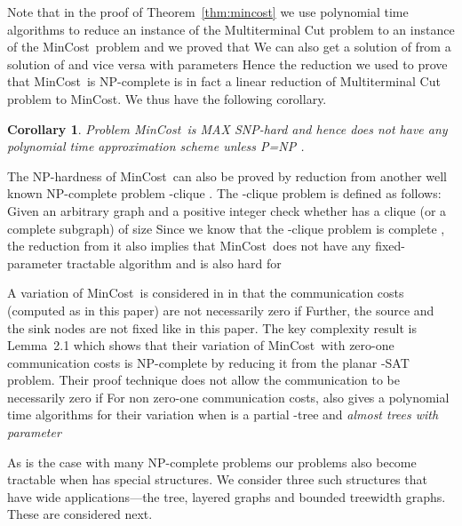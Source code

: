\documentclass[journal]{IEEEtran}
\newtheorem{corollary}{{\bf Corollary}}
\newcommand{\mincost}{\textsf{MinCost}}
\begin{document}
Note that in the proof of Theorem~\ref{thm:mincost} we use polynomial
time algorithms to reduce an instance  of the Multiterminal Cut
problem to an instance  of the \mincost\ problem and we proved
that  We can also get a
solution of  from a solution of  and vice versa with
parameters  Hence the reduction we used to prove
that \mincost\ is NP-complete is in fact a linear reduction of
Multiterminal Cut problem to \mincost. We thus have the following
corollary.

\begin{corollary}
  Problem \mincost\ is MAX SNP-hard and hence does not have any
  polynomial time approximation scheme unless P=NP \cite{Arora92}.
\end{corollary}



The NP-hardness of \mincost\ can also be proved by reduction from
another well known NP-complete problem -clique \cite{Garey79}.  The
-clique problem is defined as follows: Given an arbitrary graph
 and a positive integer  check whether
 has a clique
(or a complete subgraph) of size  Since we know that the
-clique problem is complete \cite{Downey99}, the reduction
from it also implies that \mincost\ does not have any fixed-parameter
tractable algorithm and is also hard for 

A variation of \mincost\ is considered in \cite{Fernandez-Baca89} in
that the communication costs (computed as  in this
paper) are not necessarily zero if  Further, the source and the sink nodes are not
fixed like in this paper. The key complexity result is Lemma~2.1 which
shows that their variation of \mincost\ with zero-one communication
costs is NP-complete by reducing it from the planar -SAT
problem. Their proof technique does not allow the communication to be
necessarily zero if  For
non zero-one communication costs, \cite{Fernandez-Baca89} also gives a
polynomial time algorithms for their variation when  is a
partial -tree and \textit{almost trees with parameter } 

As is the case with many NP-complete problems our problems also become
tractable when  has special structures. We consider three
such structures that have wide applications---the tree, layered graphs
and bounded treewidth graphs. These are considered next.
\end{document}

